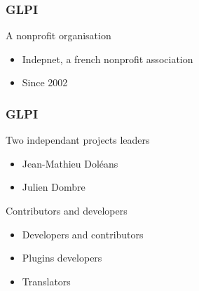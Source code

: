 \documentclass{beamer}
\begin{document}
\begin{frame}

    \frametitle{GLPI}

    \begin{block}{A nonprofit organisation}
        \begin{itemize}
            \item Indepnet, a french nonprofit association
            \item Since 2002
        \end{itemize}
    \end{block}

\end{frame}





\begin{frame}

    \frametitle{GLPI}

    \begin{block}{Two independant projects leaders}
        \begin{itemize}
            \item Jean-Mathieu Doléans
            \item Julien Dombre
        \end{itemize}
    \end{block}
\pause
    \begin{block}{Contributors and developers}
        \begin{itemize}
            \item Developers and contributors
            \item Plugins developers
            \item Translators
        \end{itemize}
    \end{block}

\end{frame}
\end{document}
